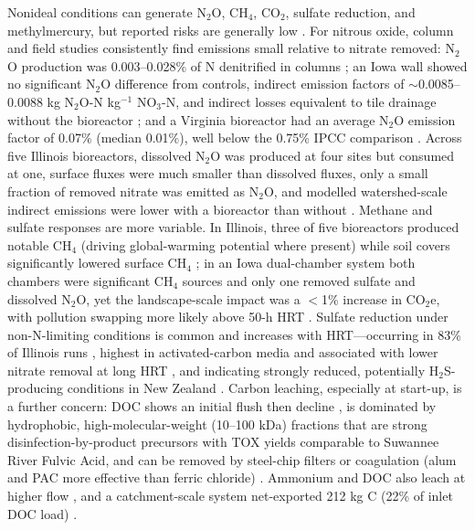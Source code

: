 \documentclass[11pt]{article}
\begin{document}
Nonideal conditions can generate N$_2$O, CH$_4$, CO$_2$, sulfate reduction, and methylmercury, but reported risks are generally low \parencite{Hartfiel2022}. For nitrous oxide, column and field studies consistently find emissions small relative to nitrate removed: N$_2$O production was 0.003--0.028\% of N denitrified in columns \parencite{Greenan2009}; an Iowa wall showed no significant N$_2$O difference from controls, indirect emission factors of $\sim$0.0085--0.0088 kg N$_2$O-N kg$^{-1}$ NO$_3$-N, and indirect losses equivalent to tile drainage without the bioreactor \parencite{Moorman2010}; and a Virginia bioreactor had an average N$_2$O emission factor of 0.07\% (median 0.01\%), well below the 0.75\% IPCC comparison \parencite{Bock2018}. Across five Illinois bioreactors, dissolved N$_2$O was produced at four sites but consumed at one, surface fluxes were much smaller than dissolved fluxes, only a small fraction of removed nitrate was emitted as N$_2$O, and modelled watershed-scale indirect emissions were lower with a bioreactor than without \parencite{Brunton2024}. Methane and sulfate responses are more variable. In Illinois, three of five bioreactors produced notable CH$_4$ (driving global-warming potential where present) while soil covers significantly lowered surface CH$_4$ \parencite{Brunton2024}; in an Iowa dual-chamber system both chambers were significant CH$_4$ sources and only one removed sulfate and dissolved N$_2$O, yet the landscape-scale impact was a $<$1\% increase in CO$_2$e, with pollution swapping more likely above 50-h HRT \parencite{Hartfiel2023b}. Sulfate reduction under non-N-limiting conditions is common and increases with HRT---occurring in 83\% of Illinois runs \parencite{Bell2015}, highest in activated-carbon media and associated with lower nitrate removal at long HRT \parencite{Povilaitis2020}, and indicating strongly reduced, potentially H$_2$S-producing conditions in New Zealand \parencite{Rivas2020}. Carbon leaching, especially at start-up, is a further concern: DOC shows an initial flush then decline \parencite{Abusallout2017,Rivas2020}, is dominated by hydrophobic, high-molecular-weight (10--100 kDa) fractions that are strong disinfection-by-product precursors with TOX yields comparable to Suwannee River Fulvic Acid, and can be removed by steel-chip filters or coagulation (alum and PAC more effective than ferric chloride) \parencite{Abusallout2017}. Ammonium and DOC also leach at higher flow \parencite{Greenan2009}, and a catchment-scale system net-exported 212 kg C (22\% of inlet DOC load) \parencite{Feyereisen2023}.
\end{document}
